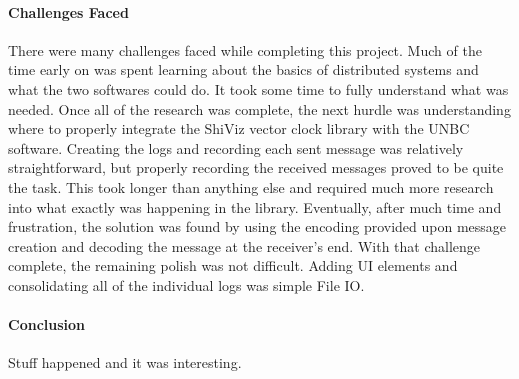 \documentclass[12pt, oneside]{article}   	%
\begin{document}
\paragraph{Challenges Faced}

There were many challenges faced while completing this project.  Much of the time early on was spent learning about the basics of distributed systems and what the two softwares could do.  It took some time to fully understand what was needed.  Once all of the research was complete, the next hurdle was understanding where to properly integrate the ShiViz vector clock library with the UNBC software.  Creating the logs and recording each sent message was relatively straightforward, but properly recording the received messages proved to be quite the task.  This took longer than anything else and required much more research into what exactly was happening in the library.  Eventually, after much time and frustration, the solution was found by using the encoding provided upon message creation and decoding the message at the receiver's end.  With that challenge complete, the remaining polish was not difficult.  Adding UI elements and consolidating all of the individual logs was simple File IO.

\paragraph{Conclusion}

Stuff happened and it was interesting.
\end{document}

